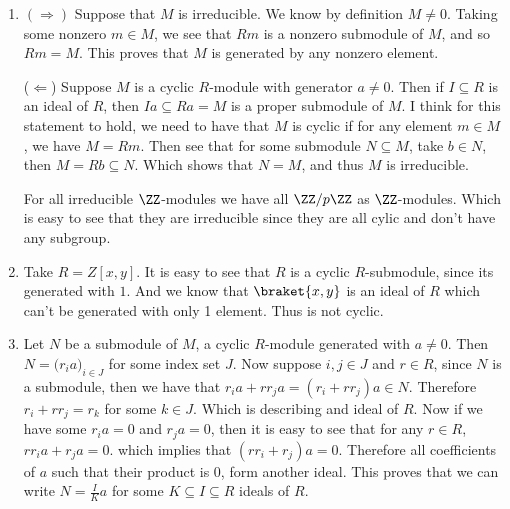 \begin{enumerate}[label=\ilabel]
    \item 
    $(\Rightarrow)$ Suppose that $M$ is irreducible. We know by definition $M\neq 0$. Taking some nonzero $m\in M$, we see that $Rm$ is a nonzero submodule of $M$, and so $Rm = M$. This proves that $M$ is generated by any nonzero element.
    
    ($\Leftarrow$) Suppose $M$ is a cyclic $R$-module with generator $a \ne 0$. Then if $I \subseteq R$ is an ideal of $R$, then $Ia \subseteq Ra = M$ is a proper submodule of $M$. I think for this statement to hold, we need to have that $M$ is cyclic if for any element $m \in M$, we have $M = Rm$. Then see that for some submodule $N \subseteq M$, take $b \in N$, then $M = Rb \subseteq N$. Which shows that $N = M$, and thus $M$ is irreducible. 

    For all irreducible $\ZZ$-modules we have all $\ZZ / p\ZZ$ as $\ZZ$-modules. Which is easy to see that they are irreducible since they are all cylic and don't have any subgroup.

    \item
        Take $R = Z[x, y]$. It is easy to see that $R$ is a cyclic $R$-submodule, since its generated with $1$. And we know that $\braket{x, y}$ is an ideal of $R$ which can't be generated with only 1 element. Thus is not cyclic.
        
    \item
        Let $N$ be a submodule of $M$, a cyclic $R$-module generated with $a \ne 0$. Then $N = \big(r_i a\big)_{i \in J}$ for some index set $J$. Now suppose $i, j \in J$ and $r \in R$, since $N$ is a submodule, then we have that $r_i a + r r_j a = (r_i + r r_j) a \in N$.
        Therefore $r_i + r r_j = r_k$ for some $ k \in J$. Which is describing and ideal of $R$. Now if we have some $r_i a = 0$ and $r_j a = 0$, then it is easy to see that for any $r \in R$, $rr_i a + r_j a = 0$. which implies that $(r r_i + r_j) a = 0$. Therefore all coefficients of $a$ such that their product is 0, form another ideal. This proves that we can write $N = \frac{I}{K} a$ for some $K \subseteq I \subseteq R$ ideals of $R$. 
\end{enumerate}